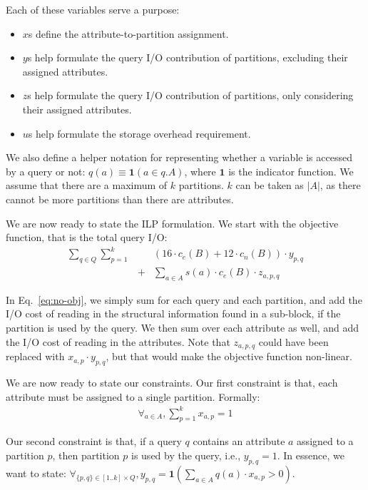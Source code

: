 Each of these variables serve a purpose:
\begin{itemize}
\item $x$s define the attribute-to-partition assignment.
\item $y$s help formulate the query I/O contribution
of partitions, excluding their assigned attributes.
\item $z$s help formulate the query I/O contribution
of partitions, only considering their assigned attributes.
\item $u$s help formulate the storage overhead requirement.
\end{itemize}

We also define a helper notation for representing whether a variable is
accessed by a query or not: $q(a)\equiv \mathbf{1}(a \in q.A)$, where
$\mathbf{1}$ is the indicator function. We assume that there are a maximum of
$k$ partitions. $k$ can be taken as $|A|$, as there cannot be more partitions
than there are attributes.

We are now ready to state the ILP formulation. We start with the objective
function, that is the total query I/O:
\begin{eqnarray}
\sum_{q\in Q} \sum_{p=1}^{k} && (16\cdot c_e(B) + 12\cdot c_n(B))\cdot
y_{p,q}\nonumber\\ 
&+& \sum_{a\in A} s(a)\cdot c_e(B)\cdot z_{a,p,q}\label{eq:no-obj}
\end{eqnarray}

In Eq.~\ref{eq:no-obj}, we simply sum for each query and each partition, and
add the I/O cost of reading in the structural information found in a
sub-block, if the partition is used by the query. We then sum over each
attribute as well, and add the I/O cost of reading in the attributes. Note
that $z_{a,p,q}$ could have been  replaced with $x_{a,p}\cdot y_{p,q}$, but
that would make the objective function non-linear. 

We are now ready to state our constraints. Our first constraint is that, each
attribute must be assigned to a single partition. Formally:
\begin{eqnarray}
\forall_{a\in A}, \sum_{p=1}^{k} x_{a,p} = 1
\end{eqnarray}

Our second constraint is that, if a query $q$ contains an attribute $a$
assigned to a partition $p$, then partition $p$ is used by the query, i.e.,
$y_{p,q}=1$. In essence, we want to state: $\forall_{\{p,q\}\in [1..k]\times
Q}, y_{p,q} = \mathbf{1}(\sum_{a\in A} q(a)\cdot x_{a,p}>0)$. 

